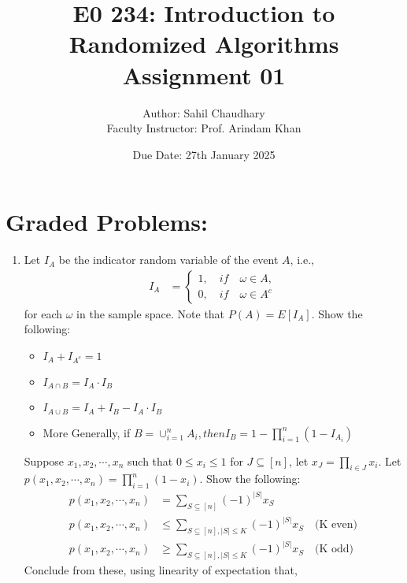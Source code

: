 \documentclass{article}
\begin{document}
\title{E0 234: Introduction to Randomized Algorithms\\ Assignment 01}
\author{Author: Sahil Chaudhary\\ Faculty Instructor: Prof. Arindam Khan}
\date{Due Date: 27th January 2025}

\maketitle

\newpage
\section*{Graded Problems:}
\begin{enumerate}
    \item Let $I_A$ be the indicator random variable of the event $A$, i.e., 
    \begin{align*}
        I_A &= \begin{cases}
            1, \quad if \quad \omega \in A,\\
            0, \quad if \quad \omega \in A^c
        \end{cases}
    \end{align*}
    for each $\omega$ in the sample space. Note that $P(A)=E[I_A]$. Show the following:
    \begin{itemize}
        \item $I_A + I_{A^c} = 1$
        \item $I_{A \cap B} = I_A \cdot I_B$ 
        \item $I_{A \cup B} = I_A + I_B - I_A \cdot I_B$
        \item More Generally, if $B = \cup_{i=1}^{n}A_i, then I_B = 1-\prod_{i=1}^{n}(1-I_{A_i})$
    \end{itemize}
    Suppose $x_1,x_2,\cdots, x_n$ such that $0 \leq x_i \leq 1$ for $J \subseteq [n]$, let $x_J = \prod_{i\in J}x_i$. Let $p(x_1,x_2,\cdots,x_n)=\prod_{i=1}^{n}(1-x_i)$. Show the following:
    \begin{align*}
        p(x_1,x_2,\cdots,x_n) &= \sum_{S \subseteq [n]}(-1)^{|S|}x_S\\
        p(x_1,x_2,\cdots,x_n) &\leq \sum_{S \subseteq [n], |S| \leq K}(-1)^{|S|}x_S \quad \text{(K even)}\\
        p(x_1,x_2,\cdots,x_n) &\geq \sum_{S \subseteq [n], |S| \leq K}(-1)^{|S|}x_S \quad \text{(K odd)}
    \end{align*}
    Conclude from these, using linearity of expectation that,
    \begin{align*}

\end{align*}
\end{enumerate}
\end{document}
